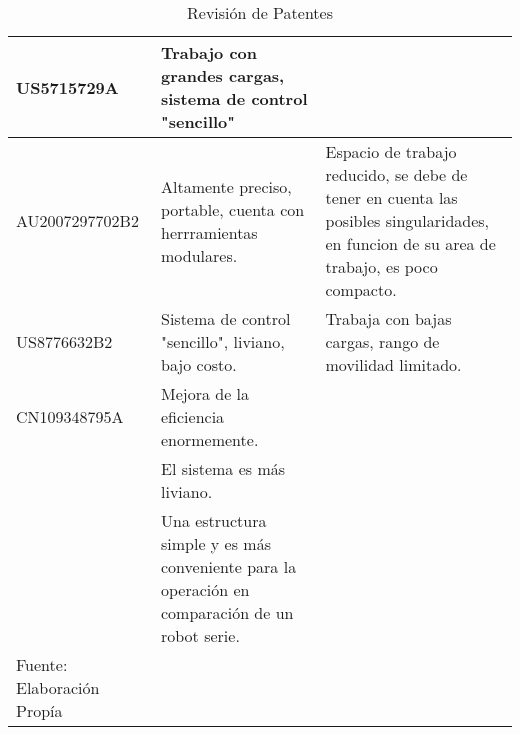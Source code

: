 \begin{longtable}{|>{\columncolor[gray]{0.85}}p{}|p{}|p{}|}
US5715729A & Trabajo con grandes cargas, sistema de control "sencillo" & \\ \cline{1-3}

AU2007297702B2 & Altamente preciso, portable, cuenta con herrramientas modulares. & Espacio de trabajo reducido, se debe de tener en cuenta las posibles singularidades, en funcion de su area de trabajo, es poco compacto.\\ \cline{1-3}

US8776632B2 & Sistema de control "sencillo", liviano, bajo costo. & Trabaja con bajas cargas, rango de movilidad limitado. \\ \cline{1-3}

CN109348795A & Mejora de la eficiencia enormemente. & \\
 & El sistema es más liviano. & \\
 & Una estructura simple y es más conveniente para la operación en comparación de un robot serie. & \\ \cline{1-3}
 
\caption{Revisión de Patentes}{Fuente: Elaboración Propía}
\label{table:PatentRevision}
\end{longtable}